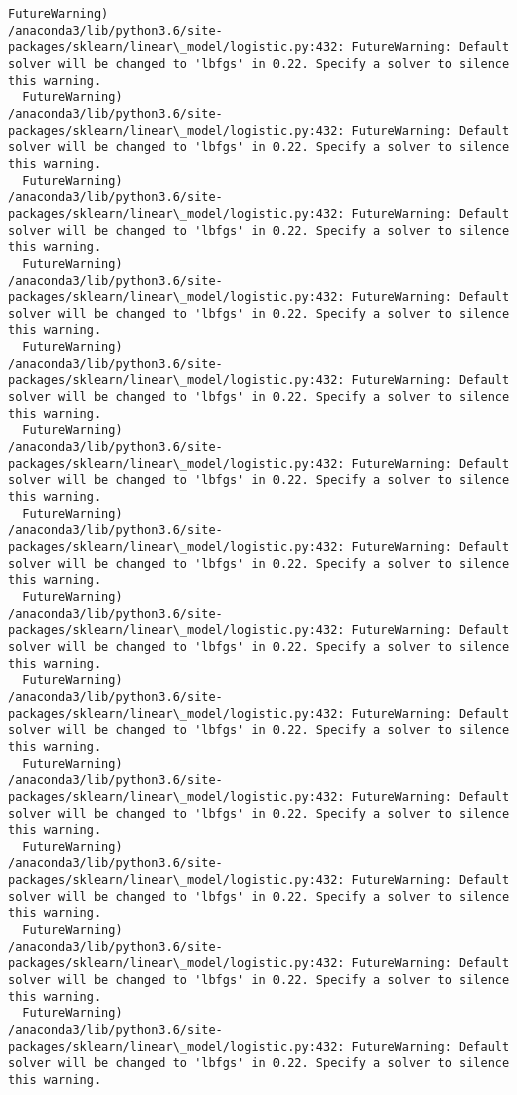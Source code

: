 \documentclass[11pt]{article}
\begin{document}
\begin{Verbatim}[commandchars=\\\{\}]
  FutureWarning)
/anaconda3/lib/python3.6/site-packages/sklearn/linear\_model/logistic.py:432: FutureWarning: Default solver will be changed to 'lbfgs' in 0.22. Specify a solver to silence this warning.
  FutureWarning)
/anaconda3/lib/python3.6/site-packages/sklearn/linear\_model/logistic.py:432: FutureWarning: Default solver will be changed to 'lbfgs' in 0.22. Specify a solver to silence this warning.
  FutureWarning)
/anaconda3/lib/python3.6/site-packages/sklearn/linear\_model/logistic.py:432: FutureWarning: Default solver will be changed to 'lbfgs' in 0.22. Specify a solver to silence this warning.
  FutureWarning)
/anaconda3/lib/python3.6/site-packages/sklearn/linear\_model/logistic.py:432: FutureWarning: Default solver will be changed to 'lbfgs' in 0.22. Specify a solver to silence this warning.
  FutureWarning)
/anaconda3/lib/python3.6/site-packages/sklearn/linear\_model/logistic.py:432: FutureWarning: Default solver will be changed to 'lbfgs' in 0.22. Specify a solver to silence this warning.
  FutureWarning)
/anaconda3/lib/python3.6/site-packages/sklearn/linear\_model/logistic.py:432: FutureWarning: Default solver will be changed to 'lbfgs' in 0.22. Specify a solver to silence this warning.
  FutureWarning)
/anaconda3/lib/python3.6/site-packages/sklearn/linear\_model/logistic.py:432: FutureWarning: Default solver will be changed to 'lbfgs' in 0.22. Specify a solver to silence this warning.
  FutureWarning)
/anaconda3/lib/python3.6/site-packages/sklearn/linear\_model/logistic.py:432: FutureWarning: Default solver will be changed to 'lbfgs' in 0.22. Specify a solver to silence this warning.
  FutureWarning)
/anaconda3/lib/python3.6/site-packages/sklearn/linear\_model/logistic.py:432: FutureWarning: Default solver will be changed to 'lbfgs' in 0.22. Specify a solver to silence this warning.
  FutureWarning)
/anaconda3/lib/python3.6/site-packages/sklearn/linear\_model/logistic.py:432: FutureWarning: Default solver will be changed to 'lbfgs' in 0.22. Specify a solver to silence this warning.
  FutureWarning)
/anaconda3/lib/python3.6/site-packages/sklearn/linear\_model/logistic.py:432: FutureWarning: Default solver will be changed to 'lbfgs' in 0.22. Specify a solver to silence this warning.
  FutureWarning)
/anaconda3/lib/python3.6/site-packages/sklearn/linear\_model/logistic.py:432: FutureWarning: Default solver will be changed to 'lbfgs' in 0.22. Specify a solver to silence this warning.
  FutureWarning)
/anaconda3/lib/python3.6/site-packages/sklearn/linear\_model/logistic.py:432: FutureWarning: Default solver will be changed to 'lbfgs' in 0.22. Specify a solver to silence this warning.

\end{Verbatim}
\end{document}

